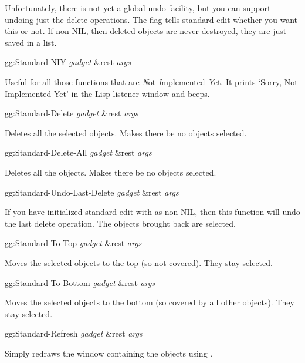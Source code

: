 Unfortunately, there is not yet a global undo facility, but you can
support undoing just the delete operations.  The 
flag tells standard-edit whether you want this or not.  If non-NIL,
then deleted objects are never destroyed, they are just saved in a
list.

\begin{programexample}
gg:Standard-NIY {\it gadget} \&rest {\it args} \value{function}
\end{programexample}

Useful for all those functions that are {\it N}ot {\it I}mplemented
{\it Y}et.  It prints `Sorry, Not Implemented Yet' in the Lisp listener
window and beeps.


\begin{programexample}
gg:Standard-Delete {\it gadget} \&rest {\it args} \value{function}
\end{programexample}
Deletes all the selected objects.  Makes there be no objects selected.

\begin{programexample}
gg:Standard-Delete-All {\it gadget} \&rest {\it args} \value{function}
\end{programexample}
Deletes all the objects.  Makes there be no objects selected.

\begin{programexample}
gg:Standard-Undo-Last-Delete {\it gadget} \&rest {\it args} \value{function}
\end{programexample}
If you have initialized standard-edit with  as
non-NIL, then this function will undo the last delete operation.  The
objects brought back are selected.

\begin{programexample}
gg:Standard-To-Top {\it gadget} \&rest {\it args} \value{function}
\end{programexample}
Moves the selected objects to the top (so not covered).  They stay selected.

\begin{programexample}
gg:Standard-To-Bottom {\it gadget} \&rest {\it args} \value{function}
\end{programexample}
Moves the selected objects to the bottom (so covered by all other
objects).  They stay selected.

\begin{programexample}
gg:Standard-Refresh {\it gadget} \&rest {\it args} \value{function}
\end{programexample}
Simply redraws the window containing the objects using
.

